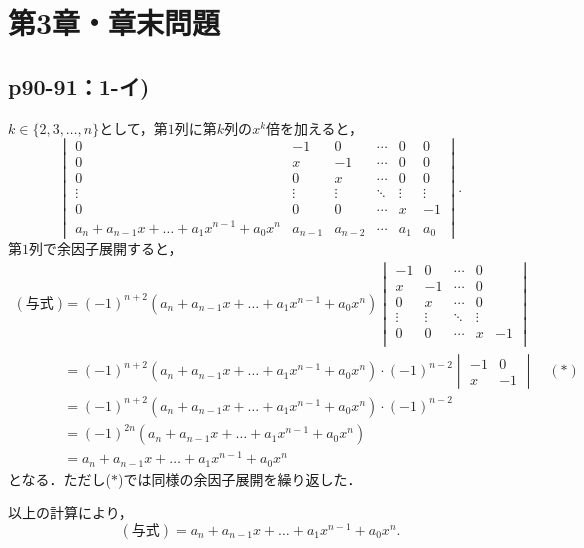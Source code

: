 \documentclass[uplatex,dvipdfmx,a4paper,11pt,fleqn]{jsarticle}
\begin{document}
    \newpage 
\section*{第3章・章末問題}


\subsection*{p90-91：1-イ)}

\begin{tleftbar}
    $ k \in \{ 2,3 ,\ldots,n \}$として，第$1$列に第$k$列の$x^k$倍を加えると，
    \[
        \begin{vmatrix} 
            0 & -1 & 0 & \cdots & 0 & 0 \\
            0 & x & -1 & \cdots & 0 & 0\\
            0 & 0 & x & \cdots & 0 & 0 \\
            \vdots & \vdots & \vdots & \ddots & \vdots & \vdots\\
            0 & 0 & 0 & \cdots & x & -1 \\
            a_n + a_{n-1} x + \dots +a_1 x^{n-1} + a_0 x^n & a_{n-1} & a_{n-2} & \cdots & a_1 & a_0
        \end{vmatrix}.
    \]
    第$1$列で余因子展開すると，
    \begin{align*} 
        (\text{与式})& = (-1)^{n+2} (a_n + a_{n-1} x + \dots +a_1 x^{n-1} + a_0 x^n)
        \begin{vmatrix} 
            -1 & 0 & \cdots & 0 \\
             x & -1 & \cdots & 0\\
             0 & x & \cdots & 0 \\
            \vdots & \vdots & \ddots & \vdots &\\
             0 & 0 & \cdots & x & -1 \\
        \end{vmatrix} \\
        & = (-1)^{n+2}(a_n + a_{n-1} x + \dots +a_1 x^{n-1} + a_0 x^n) \cdot (-1)^{n-2} \begin{vmatrix} -1 & 0 \\ x & -1 \end{vmatrix} \quad (\text{$\ast$})\\
        & = (-1)^{n+2} (a_n + a_{n-1} x + \dots +a_1 x^{n-1} + a_0 x^n) \cdot (-1)^{n-2}　\\
        & = (-1)^{2n} (a_n + a_{n-1} x + \dots +a_1 x^{n-1} + a_0 x^n) \\
        & = a_n + a_{n-1} x + \dots +a_1 x^{n-1} + a_0 x^n
    \end{align*} 
    となる．ただし($\ast$)では同様の余因子展開を繰り返した．

    以上の計算により，
    \[
        (\text{与式}) = a_n + a_{n-1} x + \dots +a_1 x^{n-1} + a_0 x^n.
    \]
\end{tleftbar}
\end{document}
